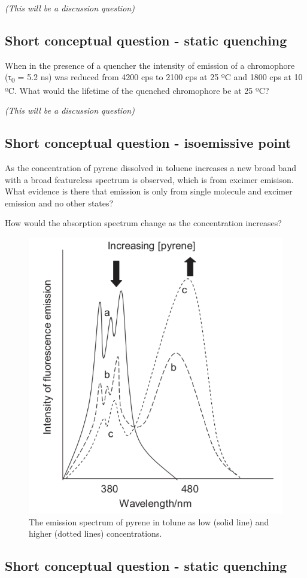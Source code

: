 \documentclass[
]{book}
\begin{document}
\emph{(This will be a discussion question)}

\hypertarget{sec:static_question}{%
\subsection{Short conceptual question - static quenching}\label{sec:static_question}}

When in the presence of a quencher the intensity of emission of a chromophore (τ\textsubscript{0} = 5.2 ns) was reduced from 4200 cps to 2100 cps at 25 ºC and 1800 cps at 10 ºC. What would the lifetime of the quenched chromophore be at 25 ºC?

\emph{(This will be a discussion question)}

\hypertarget{short-conceptual-question---isoemissive-point}{%
\subsection{Short conceptual question - isoemissive point}\label{short-conceptual-question---isoemissive-point}}

As the concentration of pyrene dissolved in toluene increases a new broad band with a broad featureless spectrum is observed, which is from excimer emisison. What evidence is there that emission is only from single molecule and excimer emission and no other states?

How would the absorption spectrum change as the concentration increases?

\begin{figure}

{\centering \includegraphics[width=0.3\linewidth]{images/pyrene} 

}

\caption{The emission spectrum of pyrene in tolune as low (solid line) and higher (dotted lines) concentrations.}\label{fig:pyrene}
\end{figure}

\hypertarget{sec:static2}{%
\subsection{Short conceptual question - static quenching}\label{sec:static2}}
\end{document}

